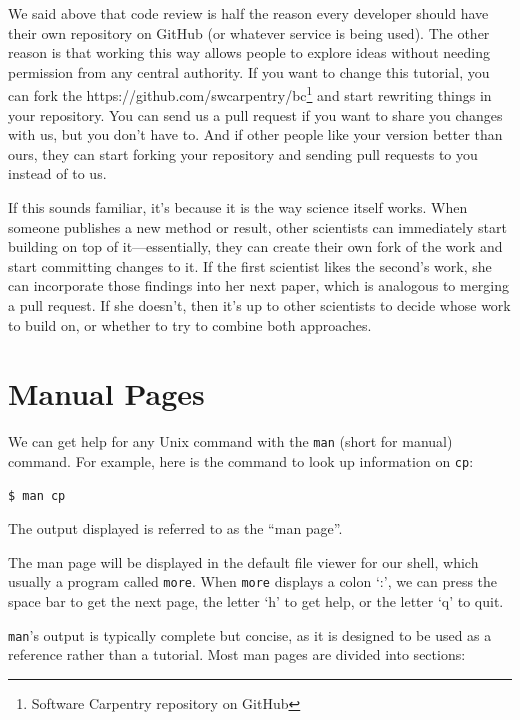 \documentclass[]{book}
\newcommand{\urlfoot}[2]{{#1}\footnote{#2}}
\begin{document}
We said above that code review is half the reason every developer should
have their own repository on GitHub (or whatever service is being used).
The other reason is that working this way allows people to explore ideas
without needing permission from any central authority. If you want to
change this tutorial, you can fork the
\urlfoot{https://github.com/swcarpentry/bc}{Software Carpentry repository
on GitHub} and start rewriting things in your repository. You can send
us a pull request if you want to share you changes with us, but you
don't have to. And if other people like your version better than ours,
they can start forking your repository and sending pull requests to you
instead of to us.

If this sounds familiar, it's because it is the way science itself
works. When someone publishes a new method or result, other scientists
can immediately start building on top of it---essentially, they can
create their own fork of the work and start committing changes to it. If
the first scientist likes the second's work, she can incorporate those
findings into her next paper, which is analogous to merging a pull
request. If she doesn't, then it's up to other scientists to decide
whose work to build on, or whether to try to combine both approaches.

\section{Manual Pages}

We can get help for any Unix command with the \texttt{man} (short for
manual) command. For example, here is the command to look up information
on \texttt{cp}:

\begin{verbatim}
$ man cp
\end{verbatim}

The output displayed is referred to as the ``man page''.

The man page will be displayed in the default file viewer for our shell,
which usually a program called \texttt{more}. When \texttt{more}
displays a colon `:', we can press the space bar to get the next page,
the letter `h' to get help, or the letter `q' to quit.

\texttt{man}'s output is typically complete but concise, as it is
designed to be used as a reference rather than a tutorial. Most man
pages are divided into sections:
\end{document}
